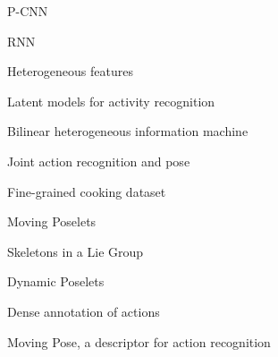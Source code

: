 P-CNN \cite{Cheron2015}

RNN \cite{YongDu2015}

Heterogeneous features \cite{Hu2015}

Latent models for activity recognition \cite{Hu2014}

Bilinear heterogeneous information machine \cite{Kong2015}

Joint action recognition and pose \cite{Nie2015}

Fine-grained cooking dataset \cite{Rohrbach2012}

Moving Poselets \cite{Tao2015}

Skeletons in a Lie Group \cite{Vemulapalli2014}

Dynamic Poselets \cite{Wang2014}

Dense annotation of actions \cite{Yeung2015}

Moving Pose, a descriptor for action recognition \cite{Zanfir2013}



